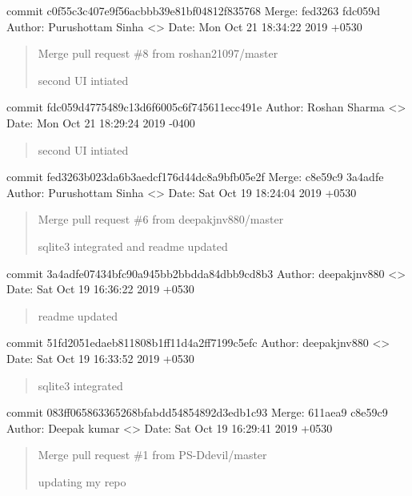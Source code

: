 \documentclass[letterpaper,10pt,english]{sphinxmanual}
\begin{document}
commit c0f55c3c407e9f56acbbb39e81bf04812f835768
Merge: fed3263 fdc059d
Author: Purushottam Sinha \textless{}\textgreater{}
Date:   Mon Oct 21 18:34:22 2019 +0530
\begin{quote}

Merge pull request \#8 from roshan21097/master

second UI intiated
\end{quote}

commit fdc059d4775489c13d6f6005c6f745611ecc491e
Author: Roshan Sharma \textless{}\textgreater{}
Date:   Mon Oct 21 18:29:24 2019 -0400
\begin{quote}

second UI intiated
\end{quote}

commit fed3263b023da6b3aedcf176d44dc8a9bfb05e2f
Merge: c8e59c9 3a4adfe
Author: Purushottam Sinha \textless{}\textgreater{}
Date:   Sat Oct 19 18:24:04 2019 +0530
\begin{quote}

Merge pull request \#6 from deepakjnv880/master

sqlite3 integrated and readme updated
\end{quote}

commit 3a4adfe07434bfc90a945bb2bbdda84dbb9cd8b3
Author: deepakjnv880 \textless{}\textgreater{}
Date:   Sat Oct 19 16:36:22 2019 +0530
\begin{quote}

readme updated
\end{quote}

commit 51fd2051edaeb811808b1ff11d4a2ff7199c5efc
Author: deepakjnv880 \textless{}\textgreater{}
Date:   Sat Oct 19 16:33:52 2019 +0530
\begin{quote}

sqlite3 integrated
\end{quote}

commit 083ff065863365268bfabdd54854892d3edb1c93
Merge: 611aea9 c8e59c9
Author: Deepak kumar \textless{}\textgreater{}
Date:   Sat Oct 19 16:29:41 2019 +0530
\begin{quote}

Merge pull request \#1 from PS-Ddevil/master

updating my repo
\end{quote}
\end{document}

